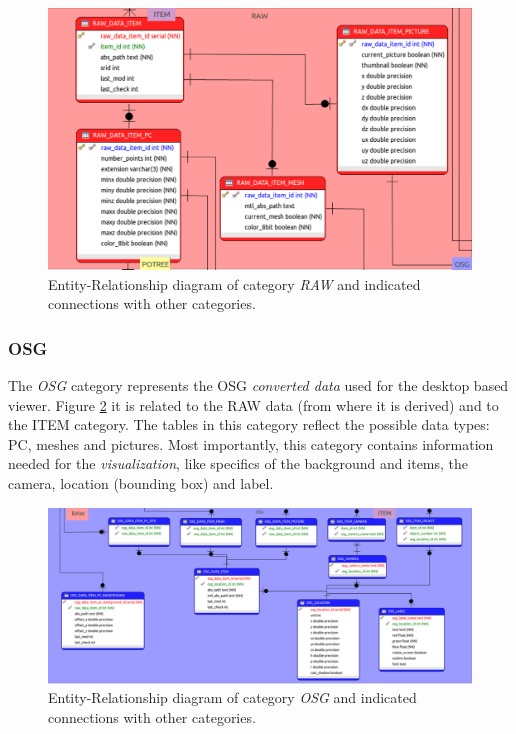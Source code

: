 \begin{figure}[H]
\centering
\includegraphics[scale=0.35]{fig/database/ERDB_RAW_conn.pdf}
\caption{Entity-Relationship diagram of category {\em RAW} and indicated connections
with other categories.}
\label{fig:db_erdb_raw}
\end{figure}

\subsubsection{OSG}
The {\em OSG} category represents the OSG \textit{converted data} used for the
desktop based viewer. Figure \ref{fig:db_erdb_osg} it is related to the RAW data
(from where it is derived) and to the ITEM category. The tables in this category
reflect the possible data types: PC, meshes and pictures. Most importantly, this
category contains information needed for the \textit{visualization}, like specifics
of the background and items, the camera, location (bounding box) and label. 

\begin{figure}[H]
\centering
\includegraphics[scale=0.35]{fig/database/ERDB_OSG_conn.pdf}
\caption{Entity-Relationship diagram of category {\em OSG} and indicated connections
with other categories.}
\label{fig:db_erdb_osg}
\end{figure}

